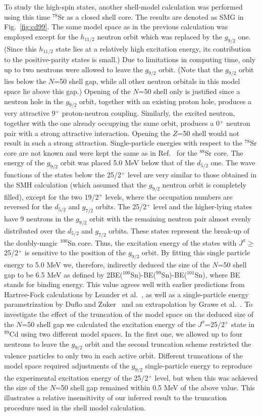 \documentclass[twoside,12pt]{article}
\begin{document}
To study the high-spin states, another shell-model calculation was performed
using this time $^{78}$Sr as a closed shell core. 
The results are denoted as SMG in Fig.~\ref{fig:cd99}.
The same model space as in the previous calculation was employed except for 
the $h_{11/2}$ neutron orbit which was replaced by the $g_{9/2}$ one. 
(Since this $h_{11/2}$ state lies at a relatively high excitation energy, 
its contribution to the positive-parity states is small.)
Due to limitations in computing time, only up to two neutrons were allowed to 
leave the $g_{9/2}$ orbit. (Note that the $g_{9/2}$ orbit lies below the $N$=50
shell gap, while all other neutron orbitals in this model space lie above 
this gap.) Opening of the $N$=50 shell only is justified 
since a neutron hole in the 
$g_{9/2}$ orbit, together with an existing proton hole, produces a very 
attractive 
9$^+$ proton-neutron coupling. Similarly, the excited neutron, together with 
the one already occupying the same orbit, 
produces a 0$^+$ neutron pair with a strong 
attractive interaction. Opening the $Z$=50 shell would not result in such
a strong attraction.
Single-particle energies with respect to the $^{78}$Sr core are not known and 
were 
kept the same as in Ref.~\cite{anne} for the $^{88}$Sr core. The energy of the 
$g_{9/2}$ orbit was placed 5.0 MeV below that of the $d_{5/2}$ one. 
The wave functions of the states below the 25/2$^+$ level are very 
similar to those obtained in the SMH calculation
(which assumed that the $g_{9/2}$ neutron orbit is completely filled),
except for the two 19/2$^+$ levels, where the occupation numbers are
reversed for the $d_{5/2}$ and $g_{7/2}$ orbits.  
The 25/2$^+$ level and the higher-lying states have 9 neutrons in the $g_{9/2}$ 
orbit with the remaining neutron pair almost evenly distributed over the 
$d_{5/2}$ and $g_{7/2}$ orbits.  These states represent the break-up 
of the doubly-magic $^{100}$Sn core.
Thus, the excitation 
energy of the states with $J^\pi$$\geq$25/2$^+$ is sensitive to the 
position of the $g_{9/2}$ orbit. By fitting this single particle energy 
to 5.0 MeV we, 
therefore, indirectly deduced the size of the $N$=50 shell gap to be 6.5 MeV
as defined by 2BE($^{100}$Sn)-BE($^{99}$Sn)-BE($^{101}$Sn), where BE stands
for binding energy. This value agrees well with earlier predictions from
Hartree-Fock calculations by Leander et al.~\cite{leander}, as well as
a single-particle energy parametrization by Duflo and Zuker~\cite{dz1999} 
and an extrapolation by Grawe et al.~\cite{grawe}. To investigate the
effect of the truncation of the model space on the deduced size of the
$N$=50 shell gap we calculated the excitation energy of the 
$J^\pi$=25/2$^+$ state in $^{99}$Cd using two different model spaces.
In the first one, we allowed up to four neutrons to leave the $g_{9/2}$
orbit and the second truncation scheme restricted the valence particles
to only two in each active orbit. Different truncations of the model space
required adjustments of the $g_{9/2}$ single-particle energy to reproduce
the experimental excitation energy of the 25/2$^+$ level, but when this
was achieved the size of the $N$=50 shell gap remained within 0.5 MeV of
the above value. This illustrates a relative insensitivity of our 
inferred result to the truncation procedure used in the shell model
calculation.
\end{document}
